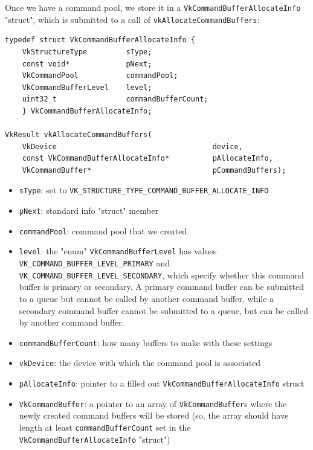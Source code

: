 \documentclass[12pt,letterpaper]{article}
\newcommand{\cil}[1]{\texttt{#1}}
\begin{document}
	Once we have a command pool,  we store it in a \cil{VkCommandBufferAllocateInfo} "struct", which is submitted to a call of \cil{vkAllocateCommandBuffers}:
		\begin{verbatim}
typedef struct VkCommandBufferAllocateInfo {
	VkStructureType         sType;
	const void*             pNext;
	VkCommandPool           commandPool;
	VkCommandBufferLevel    level;
	uint32_t                commandBufferCount;
	} VkCommandBufferAllocateInfo;
    
VkResult vkAllocateCommandBuffers(
    VkDevice                                    device,
    const VkCommandBufferAllocateInfo*          pAllocateInfo,
    VkCommandBuffer*                            pCommandBuffers);
		\end{verbatim}
        
		\begin{itemize}
			\item \cil{sType}: set to \cil{VK_STRUCTURE_TYPE_COMMAND_BUFFER_ALLOCATE_INFO}
			
			\item \cil{pNext}: standard info "struct" member
			
			\item \cil{commandPool}: command pool that we created
			
			\item \cil{level}: the "enum" \cil{VkCommandBufferLevel} has values \cil{VK_COMMAND_BUFFER_LEVEL_PRIMARY} and \cil{VK_COMMAND_BUFFER_LEVEL_SECONDARY}, which specify whether this command buffer is primary or secondary. A primary command buffer can be submitted to a queue but cannot be called by another command buffer, while a secondary command buffer cannot be submitted to a queue, but can be called by another command buffer. 
			
			\item \cil{commandBufferCount}: how many buffers to make with these settings

			\item \cil{vkDevice}: the device with which the command pool is associated
			
			\item \cil{pAllocateInfo}: pointer to a filled out \cil{VkCommandBufferAllocateInfo} struct
			
			\item \cil{VkCommandBuffer}: a pointer to an array of \cil{VkCommandBuffer}s where the newly created command buffers will be stored (so, the array should have length at least \cil{commandBufferCount} set in the \cil{VkCommandBufferAllocateInfo} "struct")
		\end{itemize}
	
\end{document}
